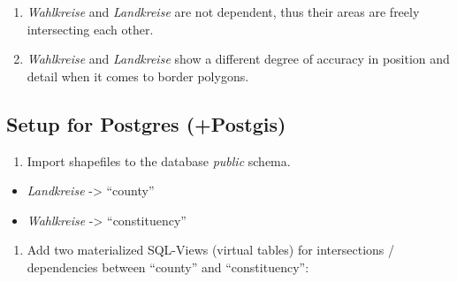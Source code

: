 \begin{enumerate}
\def\labelenumi{\arabic{enumi}.}
\itemsep1pt\parskip0pt
\item
  \emph{Wahlkreise} and \emph{Landkreise} are not dependent, thus their
  areas are freely intersecting each other.
\item
  \emph{Wahlkreise} and \emph{Landkreise} show a different degree of
  accuracy in position and detail when it comes to border polygons.
\end{enumerate}

\subsection{Setup for Postgres
(+Postgis)}\label{setup-for-postgres-postgis}

\begin{enumerate}
\def\labelenumi{\arabic{enumi}.}
\itemsep1pt\parskip0pt
\item
  Import shapefiles to the database \emph{public} schema.
\end{enumerate}

\begin{itemize}
\itemsep1pt\parskip0pt
\item
  \emph{Landkreise} -\textgreater{} ``county''
\item
  \emph{Wahlkreise} -\textgreater{} ``constituency''
\end{itemize}

\begin{enumerate}
\def\labelenumi{\arabic{enumi}.}
\setcounter{enumi}{1}
\itemsep1pt\parskip0pt
\item
  Add two materialized SQL-Views (virtual tables) for intersections /
  dependencies between ``county'' and ``constituency'':
\end{enumerate}

